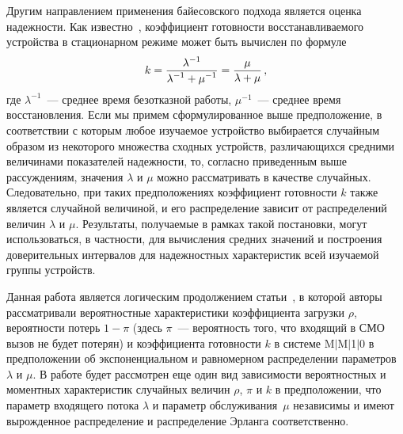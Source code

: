 \begin{multicols}{2}
Другим направлением применения байесовского подхода является оценка надежности. Как известно~\cite{Kozlov70},
коэффициент готовности восстанавливаемого устройства в стационарном режиме может быть вычислен по формуле
$$
k=\displaystyle\frac{\displaystyle \lambda^{-1}\mathstrut}{\displaystyle \lambda^{-1}+\mu^{-1}\mathstrut}=\displaystyle\frac{\displaystyle \mu\mathstrut}{\displaystyle \lambda+\mu\mathstrut}\,,
$$
где $\lambda^{-1}$~--- среднее время безотказной работы, $\mu^{-1}$~--- среднее время восстановления. Если мы примем
сформулированное выше предположение, в соответствии с которым любое изучаемое устройство выбирается случайным образом
из некоторого множества сходных устройств, различающихся средними величинами показателей надежности, то, %
соглас\-но
приведенным выше рассуждениям, значения $\lambda$ и $\mu$ можно рассматривать в качестве случайных.
Следовательно, при таких предположениях коэффициент готовности $k$ также является случайной величиной, и его
распределение зависит от распределений величин $\lambda$ и $\mu$. Результаты, получаемые в рамках такой постановки,
могут использоваться, в частности, для вычисления средних значений и построения доверительных интервалов для
надежностных характеристик всей изучаемой группы устройств.

Данная работа является логическим продолжением статьи~\cite{Apice06}, в которой авторы рассматривали вероятностные
характеристики коэффициента загрузки $\rho$, вероятности потерь $1-\pi$ (здесь $\pi$~--- вероятность того, что входящий
в СМО вызов не будет потерян) и коэффициента готовности $k$ в системе M$\vert$M$\vert$1$\vert$0 в предположении об экспоненциальном и
равномерном распределении параметров $\lambda$ и $\mu$. В работе будет рассмотрен еще один вид зависимости
вероятностных и моментных характеристик случайных величин $\rho$, $\pi$ и $k$ в предположении, что параметр входящего
потока $\lambda$ и параметр обслуживания~$\mu$ независимы и имеют вырожденное распределение и распределение Эрланга
соответственно.



\end{multicols}
